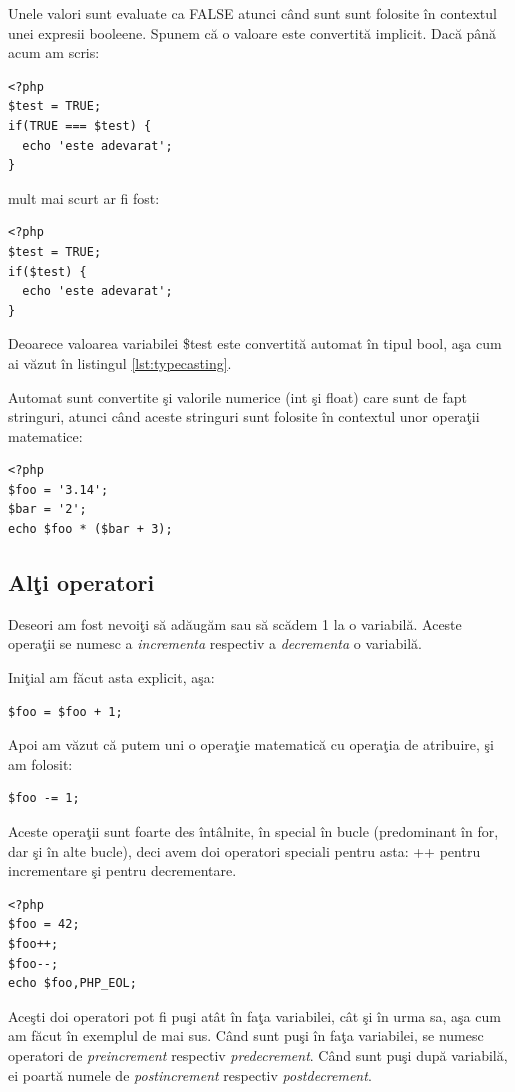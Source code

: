 Unele valori sunt evaluate ca FALSE atunci când sunt sunt folosite în
contextul unei expresii booleene. Spunem că o valoare este convertită
implicit. Dacă până acum am scris:
\begin{lstlisting}
<?php
$test = TRUE;
if(TRUE === $test) {
  echo 'este adevarat';
}
\end{lstlisting}
mult mai scurt ar fi fost:
\begin{lstlisting}
<?php
$test = TRUE;
if($test) {
  echo 'este adevarat';
}
\end{lstlisting}
Deoarece valoarea variabilei \$test este convertită automat în tipul bool, aşa cum ai văzut
în listingul \ref{lst:typecasting}.

Automat sunt convertite şi valorile numerice (int şi float) care sunt de fapt stringuri, atunci
când aceste stringuri sunt folosite în contextul unor operaţii matematice:
\begin{lstlisting}
<?php
$foo = '3.14';
$bar = '2';
echo $foo * ($bar + 3);
\end{lstlisting}


\subsection{Alţi operatori}
Deseori am fost nevoiţi să adăugăm sau să scădem 1 la o variabilă. Aceste operaţii
se numesc a \textsl{incrementa} respectiv a \textsl{decrementa} o variabilă.

Iniţial am făcut asta explicit, aşa:
\begin{lstlisting}
$foo = $foo + 1;
\end{lstlisting}
Apoi am văzut că putem uni o operaţie matematică cu operaţia de atribuire, şi am folosit:
\begin{lstlisting}
$foo -= 1;
\end{lstlisting}
Aceste operaţii sunt foarte des întâlnite, în special în bucle (predominant în for, dar şi
în alte bucle), deci avem doi operatori speciali pentru asta: ++ pentru incrementare şi
\verb --  pentru decrementare.
\begin{lstlisting}
<?php
$foo = 42;
$foo++;
$foo--;
echo $foo,PHP_EOL;
\end{lstlisting}

Aceşti doi operatori pot fi puşi atât în faţa variabilei, cât şi în urma sa, aşa
cum am făcut în exemplul de mai sus. Când sunt puşi în faţa variabilei, se numesc
operatori de \textsl{preincrement} respectiv \textsl{predecrement}. Când sunt puşi
după variabilă, ei poartă numele de \textsl{postincrement} respectiv \textsl{postdecrement}.

